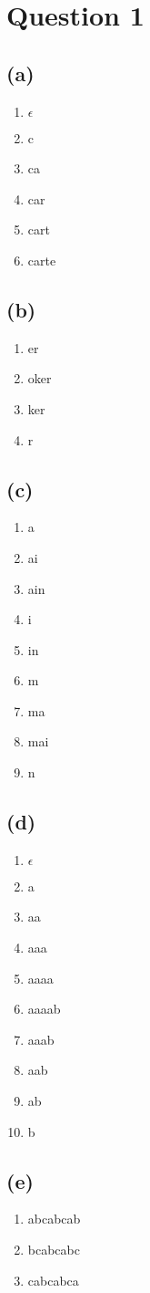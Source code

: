 \documentclass[class=article]{standalone}
\begin{document}
\section*{Question 1}
\subsection*{(a)}
\begin{enumerate}
    \item $\epsilon$
    \item c
    \item ca
    \item car
    \item cart
    \item carte
\end{enumerate}
\subsection*{(b)}
\begin{enumerate}
    \item er
    \item oker
    \item ker
    \item r
\end{enumerate}
\subsection*{(c)}
\begin{enumerate}
    \item a
    \item ai
    \item ain
    \item i
    \item in
    \item m
    \item ma
    \item mai
    \item n
\end{enumerate}
\subsection*{(d)}
\begin{enumerate}
    \item $\epsilon$
    \item a
    \item aa
    \item aaa
    \item aaaa
    \item aaaab
    \item aaab
    \item aab
    \item ab
    \item b
\end{enumerate}
\subsection*{(e)}
\begin{enumerate}
    \item abcabcab
    \item bcabcabc
    \item cabcabca
\end{enumerate}
\end{document}
